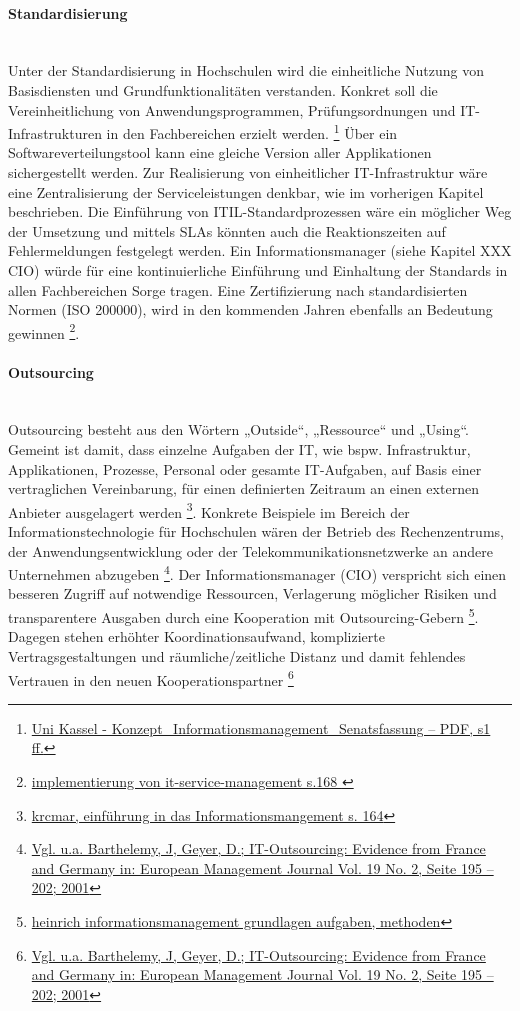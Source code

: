 \paragraph{Standardisierung}\mbox{}\\
Unter der Standardisierung in Hochschulen wird die einheitliche Nutzung von Basisdiensten und Grundfunktionalitäten verstanden. Konkret soll die Vereinheitlichung von Anwendungsprogrammen, Prüfungsordnungen und IT-Infrastrukturen in den Fachbereichen erzielt werden. \footnote{\url{Uni Kassel - Konzept_Informationsmanagement_Senatsfassung – PDF, s1 ff.}}
Über ein Softwareverteilungstool kann eine gleiche Version aller Applikationen sichergestellt werden. Zur Realisierung von einheitlicher IT-Infrastruktur wäre eine Zentralisierung der Serviceleistungen denkbar, wie im vorherigen Kapitel beschrieben. Die Einführung von ITIL-Standardprozessen wäre ein möglicher Weg der Umsetzung und mittels SLAs könnten auch die Reaktionszeiten auf Fehlermeldungen festgelegt werden. Ein Informationsmanager (siehe Kapitel XXX CIO) würde für eine kontinuierliche Einführung und Einhaltung der Standards in allen Fachbereichen Sorge tragen. Eine Zertifizierung nach standardisierten Normen (ISO 200000), wird in den kommenden Jahren ebenfalls an Bedeutung gewinnen \footnote{\url{implementierung von it-service-management s.168 }}.


\paragraph{Outsourcing}\mbox{}\\
Outsourcing besteht aus den Wörtern „Outside“, „Ressource“ und „Using“. Gemeint ist damit, dass einzelne Aufgaben der IT, wie bspw. Infrastruktur, Applikationen, Prozesse, Personal oder gesamte IT-Aufgaben, auf Basis einer vertraglichen Vereinbarung, für einen definierten Zeitraum an einen externen Anbieter ausgelagert werden \footnote{\url{krcmar, einführung in das Informationsmangement s. 164}}. Konkrete Beispiele im Bereich der Informationstechnologie für Hochschulen wären der Betrieb des Rechenzentrums, der Anwendungsentwicklung oder der Telekommunikationsnetzwerke an andere Unternehmen abzugeben \footnote{\url{Vgl. u.a. Barthelemy, J, Geyer, D.; IT-Outsourcing: Evidence from France and Germany in: European Management Journal Vol. 19 No. 2, Seite 195 – 202; 2001}}. Der Informationsmanager (CIO) verspricht sich einen besseren Zugriff auf notwendige Ressourcen, Verlagerung möglicher Risiken und transparentere Ausgaben durch eine Kooperation mit Outsourcing-Gebern \footnote{\url{heinrich informationsmanagement grundlagen aufgaben, methoden}}. Dagegen stehen erhöhter Koordinationsaufwand, komplizierte Vertragsgestaltungen und räumliche/zeitliche Distanz und damit fehlendes Vertrauen in den neuen Kooperationspartner \footnote{\url{Vgl. u.a. Barthelemy, J, Geyer, D.; IT-Outsourcing: Evidence from France and Germany in: European Management Journal Vol. 19 No. 2, Seite 195 – 202; 2001}}

